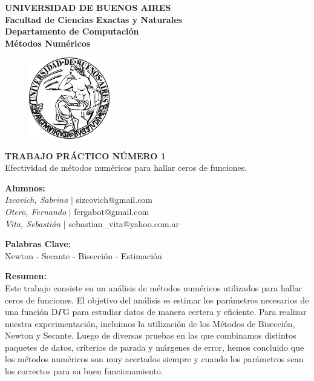 \documentclass[10pt, a4paper]{article}
\begin{document}
\thispagestyle{empty}
\begin{center}

\Huge{ \bf{UNIVERSIDAD DE BUENOS AIRES}}
\\
\LARGE{\bf{Facultad de Ciencias Exactas y Naturales}}
\\
\textbf{Departamento de Computaci\'on}
\\
\textbf{M\'etodos Num\'ericos}
\vspace{2.0\baselineskip}
\end{center}


\begin{figure}[h] %
\begin{center}
\includegraphics[width=100pt]{./image.jpeg}
\end{center}
\end{figure}
\begin{center}
\vspace*{0.7cm}

\huge{\bf TRABAJO PR\'ACTICO N\'UMERO 1}\\
\huge{Efectividad de m\'etodos num\'ericos para hallar ceros de funciones.}
\vspace*{2.2cm}

\end{center}

\LARGE {\textbf{Alumnos:}}\\
\Large{\textsl{Izcovich, Sabrina} $|$ sizcovich@gmail.com}\\
\Large{\textsl{Otero, Fernando} \hspace{0.1cm}$|$ fergabot@gmail.com}\\
\Large{\textsl{Vita, Sebasti\'an} \hspace{0.37cm}$|$ sebastian\_vita@yahoo.com.ar}
\vspace{0.6cm}

\LARGE {\textbf{Palabras Clave:}}\\
\large {Newton - Secante - Bisecci\'on - Estimaci\'on}
\vspace*{1.1cm}

\LARGE{\textbf{Resumen:}}\\
\large {Este trabajo consiste en un an\'alisis de m\'etodos num\'ericos utilizados para hallar ceros de funciones. El objetivo del an\'alisis es estimar los par\'ametros necesarios de una funci\'on D$\Gamma$G para estudiar datos de manera certera y eficiente. Para realizar nuestra experimentaci\'on, incluimos la utilizaci\'on de los M\'etodos de Bisecci\'on, Newton y Secante. Luego de diversas pruebas en las que combinamos distintos paquetes de datos, criterios de parada y m\'argenes de error, hemos concluido que los m\'etodos num\'ericos son muy acertados siempre y cuando los par\'ametros sean los correctos para su buen funcionamiento.}
\newline
 
\end{document}
